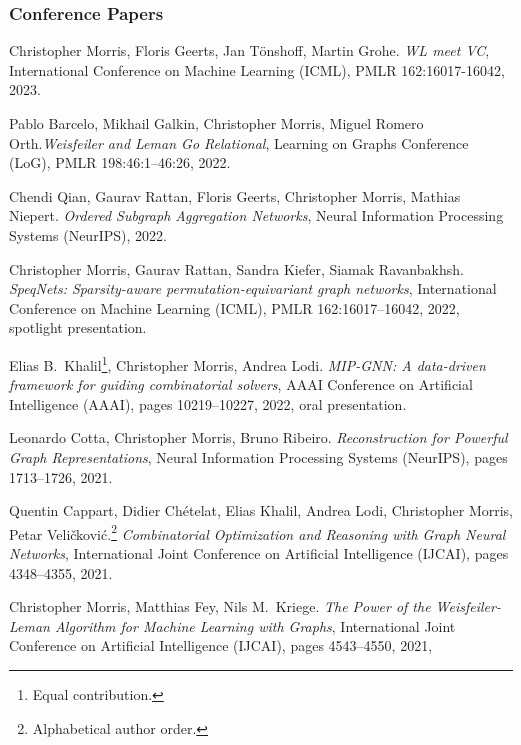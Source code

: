 \documentclass[11pt, a4paper, DIV=14, headings=small]{scrartcl}
\begin{document}
	\begin{thebibliography}{15}
		
		\subsubsection*{Conference Papers}
		Christopher Morris, Floris Geerts, Jan Tönshoff, Martin Grohe.
		\emph{WL meet VC},
		International Conference on Machine Learning (ICML), PMLR 162:16017-16042, 2023.
		
		Pablo Barcelo, Mikhail Galkin, Christopher Morris, Miguel Romero Orth.\footnotemark[2]
		\emph{Weisfeiler and Leman Go Relational},
		Learning on Graphs Conference (LoG), PMLR 198:46:1--46:26, 2022.
		
		Chendi Qian, Gaurav Rattan, Floris Geerts, Christopher Morris, Mathias Niepert.
		\emph{Ordered Subgraph Aggregation Networks},
		Neural Information Processing Systems (NeurIPS), 2022.
		
		Christopher Morris, Gaurav Rattan, Sandra Kiefer, Siamak Ravanbakhsh.
		\emph{SpeqNets: Sparsity-aware permutation-equivariant graph networks},
		International Conference on Machine Learning (ICML), PMLR 162:16017--16042, 2022, spotlight presentation.
		
		Elias B.\, Khalil\footnote{Equal contribution.}, Christopher Morris{\footnotemark[1]}, Andrea Lodi.
		\emph{MIP-GNN: A data-driven framework for guiding combinatorial solvers},
		AAAI Conference on Artificial Intelligence (AAAI), pages 10219--10227, 2022, oral presentation.
		
		Leonardo Cotta, Christopher Morris, Bruno Ribeiro.
		\emph{Reconstruction for Powerful Graph Representations},
		Neural Information Processing Systems (NeurIPS), pages 1713--1726, 2021.
		
		Quentin Cappart, Didier Chételat, Elias Khalil, Andrea Lodi, Christopher Morris, Petar Veli\v{c}kovi\'{c}.\footnote{Alphabetical author order.}
		\emph{Combinatorial Optimization and Reasoning with Graph Neural Networks},
		International Joint Conference on Artificial Intelligence (IJCAI), pages 4348--4355, 2021.
		
		Christopher Morris, Matthias Fey, Nils M.~Kriege.
		\emph{The Power of the Weisfeiler-Leman Algorithm for Machine Learning with Graphs},
		International Joint Conference on Artificial Intelligence (IJCAI), pages 4543--4550, 2021,
		

\end{thebibliography}
\end{document}
